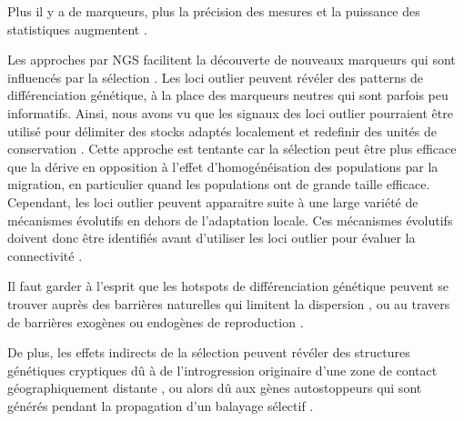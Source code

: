 \documentclass[a4paper,11pt,twoside]{report}
\begin{document}
Plus il y a de marqueurs, plus la précision des mesures et la puissance des statistiques augmentent \citep{waples1998separating} \citep{Gagnaire:2015aa}.	
	
Les approches par NGS facilitent la découverte de nouveaux marqueurs qui sont influencés par la sélection \citep{allendorf2010genomics}\citep{stapley2010adaptation} \citep{Gagnaire:2015aa}. Les loci outlier peuvent révéler des patterns de différenciation génétique, à la place des marqueurs neutres qui sont parfois peu informatifs. Ainsi, nous avons vu que les signaux des loci outlier pourraient être utilisé pour délimiter des stocks adaptés localement et redefinir des unités de conservation \citep{nielsen2011genotype} \citep{funk2012harnessing} \citep{Gagnaire:2015aa}. Cette approche est tentante car la sélection peut être plus efficace que la dérive en opposition à l'effet d'homogénéisation des populations par la migration, en particulier quand les populations ont de grande taille efficace. Cependant, les loci outlier peuvent apparaitre suite à une large variété de mécanismes évolutifs en dehors de l'adaptation locale. Ces mécanismes évolutifs doivent donc être identifiés avant d'utiliser les loci outlier pour évaluer la connectivité \citep{Gagnaire:2015aa}. 	

Il faut garder à l'esprit que les hotspots de différenciation génétique peuvent se trouver auprès des barrières naturelles qui limitent la dispersion \citep{barton1979dynamics}, ou au travers de barrières exogènes ou endogènes de reproduction \citep{bierne2011coupling}. 

De plus, les effets indirects de la sélection peuvent révéler des structures génétiques cryptiques dû à de l'introgression originaire d'une zone de contact géographiquement distante \citep{gagnaire2011within}, ou alors dû aux gènes autostoppeurs qui sont générés pendant la propagation d'un balayage sélectif \citep{bierne2010distinctive} \citep{Gagnaire:2015aa}.
\end{document}

